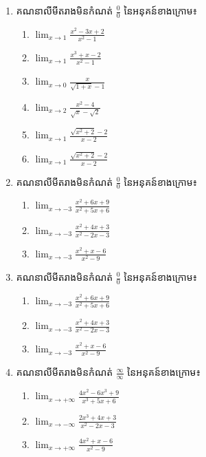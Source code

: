 \documentclass[12pt, a4paper]{article}
\begin{document}
\maketitle\koc
\begin{enumerate}[m]
	\item គណនាលីមីតរាងមិនកំណត់ $\frac{0}{0}$ នៃអនុគន៍ខាងក្រោម៖
		\begin{enumerate}[k,3]
			\item $\lim_{x\to1}\frac{x^2-3x+2}{x^2-1}$
			\item $\lim_{x\to1}\frac{x^3+x-2}{x^2-1}$
			\item $\lim_{x\to0}\frac{x}{\sqrt{1+x}-1}$
			\item $\lim_{x\to2}\frac{x^2-4}{\sqrt{x}-\sqrt{2}}$
			\item $\lim_{x\to1}\frac{\sqrt{x^2+2}-2}{x-2}$
			\item $\lim_{x\to1}\frac{\sqrt{x^2+2}-2}{x-2}$
		\end{enumerate}
	\item គណនាលីមីតរាងមិនកំណត់ $\frac{0}{0}$ នៃអនុគន៍ខាងក្រោម៖
		\begin{enumerate}[k,3]
			\item $\lim_{x\to-3}\frac{x^2+6x+9}{x^2+5x+6}$
			\item $\lim_{x\to-3}\frac{x^2+4x+3}{x^2-2x-3}$
			\item $\lim_{x\to-3}\frac{x^2+x-6}{x^2-9}$
		\end{enumerate}
	\item គណនាលីមីតរាងមិនកំណត់ $\frac{0}{0}$ នៃអនុគន៍ខាងក្រោម៖
		\begin{enumerate}[k,3]
			\item $\lim_{x\to-3}\frac{x^2+6x+9}{x^2+5x+6}$
			\item $\lim_{x\to-3}\frac{x^2+4x+3}{x^2-2x-3}$
			\item $\lim_{x\to-3}\frac{x^2+x-6}{x^2-9}$
		\end{enumerate}
	\item គណនាលីមីតរាងមិនកំណត់ $\frac{\infty}{\infty}$ នៃអនុគន៍ខាងក្រោម៖
	\begin{enumerate}[k,3]
		\item $\lim_{x\to+\infty}\frac{4x^2-6x^3+9}{x^3+5x+6}$
		\item $\lim_{x\to-\infty}\frac{2x^3+4x+3}{x^2-2x-3}$
		\item $\lim_{x\to+\infty}\frac{4x^2+x-6}{x^2-9}$
	\end{enumerate}
	{\color{blue}\hrulefill}
	\vspace{10pt}
	\makeads
	{\color{blue}\hrulefill}\\
	\vspace{10pt}
	\centering \huge {}
\end{enumerate}
\end{document}
